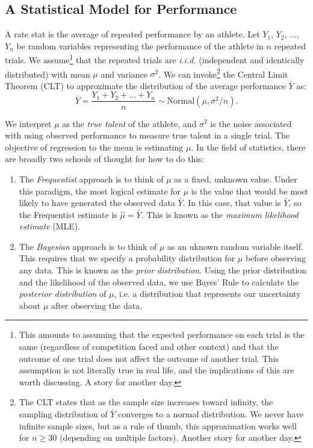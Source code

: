 \documentclass{article}
\begin{document}
  \subsection{\sc A Statistical Model for Performance}

    A rate stat is the average of repeated performance by an athlete. Let $Y_1$, $Y_2$, ..., $Y_n$ be random variables representing the performance of the athlete in $n$ repeated trials. We assume\footnote{This amounts to assuming that the expected performance on each trial is the same (regardless of competition faced and other context) and that the outcome of one trial does not affect the outcome of another trial. This assumption is not literally true in real life, and the implications of this are worth discussing. A story for another day.} that the repeated trials are {\it i.i.d.} (independent and identically distributed) with mean $\mu$ and variance $\sigma^2$. We can invoke\footnote{The CLT states that as the sample size increases toward infinity, the sampling distribution of $\bar Y$ converges to a normal distribution. We never have infinite sample sizes, but as a rule of thumb, this approximation works well for $n \ge 30$ (depending on multiple factors). Another story for another day.} the Central Limit Theorem (CLT) to approximate the distribution of the average performance $\bar Y$ as:
    \begin{equation}
      \label{eqn-likelihood}
      \bar Y = \frac{Y_1 + Y_2 + ... + Y_n}{n} \sim \mbox{Normal}(\mu, \sigma^2 / n).
    \end{equation}

    We interpret $\mu$ as the {\it true talent} of the athlete, and $\sigma^2$ is the noise associated with using observed performance to measure true talent in a single trial. The objective of regression to the mean is estimating $\mu$. In the field of statistics, there are broadly two schools of thought for how to do this:
    \begin{enumerate}
      \item The {\it Frequentist} approach is to think of $\mu$ as a fixed, unknown value. Under this paradigm, the most logical estimate for $\mu$ is the value that would be most likely to have generated the observed data $\bar Y$. In this case, that value is $\bar Y$, so the Frequentist estimate is $\hat \mu = \bar Y$. This is known as the {\it maximum likelihood estimate} (MLE).
      \item The {\it Bayesian} approach is to think of $\mu$ as an uknown random variable itself. This requires that we specify a probability distribution for $\mu$ before observing any data. This is known as the {\it prior distribution}. Using the prior distribution and the likelihood of the observed data, we use Bayes' Rule to calculate the {\it posterior distribution} of $\mu$, i.e. a distribution that represents our uncertainty about $\mu$ after observing the data.
    \end{enumerate}
\end{document}
